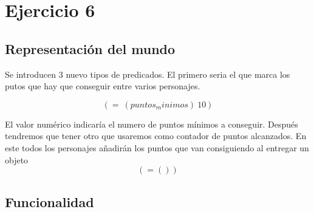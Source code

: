 \documentclass[]{article}
\begin{document}
	\section{Ejercicio 6}
	\subsection{Representación del mundo}
	Se introducen 3 nuevo tipos de predicados. El primero seria el que marca los putos que hay que conseguir entre varios personajes.
	
	$$
	(=\ (puntos_minimos)\ 10)
	$$
	
	El valor numérico indicaría el numero de puntos mínimos a conseguir.
	Después tendremos que tener otro que usaremos como contador de puntos alcanzados. En este todos los personajes añadirán los puntos que van consiguiendo al entregar un objeto
	$$
	(= ())
	$$
	\subsection{Funcionalidad}
	\begin{lstlisting}
	
	\end{lstlisting}
	\begin{lstlisting}
	
	\end{lstlisting}
	
	
\end{document}
